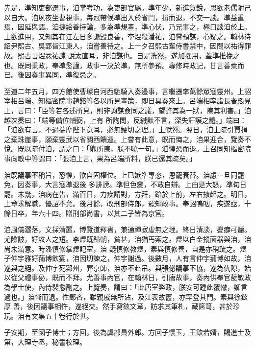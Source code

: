 \begin{pinyinscope}
 先是，準知吏部選事，洎掌考功，為吏部官屬。準年少，新進氣銳，思欲老儒附己以自大。洎夙夜坐曹視事，每冠帶候準出入於省門，揖而退，不交一談。準益重焉，因延與語。洎捷給善持論，多為準規畫，準心伏，乃兄事之，極口談洎於上。上欲進用，又知其在江左日多讒毀良善，李煜殺潘祐，洎嘗預謀，心疑之。翰林待詔尹熙古、吳郢皆江東人，洎嘗善待之。上一夕召熙古輩侍書禁中，因問以祐得罪故。熙古言煜忿祐諫
 說太直耳，非洎謀也。自是洗然，遂加擢用，蓋準推挽之也。既同秉政，奉準愈謹，政事一決於準，無所參預。專修時政記，甘言善柔而已。後因奏事異同，準復忌之。



 至道二年五月，四方館使曹璨自河西馳騎入奏邊事，言繼遷率萬餘眾寇靈州。上詔宰相呂端、知樞密院事趙鎔等各以所見畫策，即日具奏來上。呂端相率詣長春殿見上，言曰：「臣等若各述所見，則非詢謀僉同之議，望許其為一狀，陳其利害。」洎越次奏曰：「端等備位輔弼，上有
 所詢問，反緘默不言，深失訐謨之體。」端曰：「洎欲有言，不過揣摩陛下意耳，必無鯁切之理。」上默然。翌日，洎上疏引賈捐之棄珠崖事，願棄靈武以省關西饋運。上嘗有此意，既而悔之，洎果迎合，覽奏不悅。既以疏付洎，謂之曰：「卿所陳，朕不曉一句。」洎惶恐而退。上召同知樞密院事向敏中等謂曰：「張洎上言，果為呂端所料，朕已還其疏矣。」



 洎既議事不稱旨，恐懼，欲自固權位。上已嫉準專恣，恩寵衰替。洎慮一旦同罷免，因奏事，大言寇準退後
 多誹謗。準但色變，不敢自辯。上由是大怒，準旬日罷。未幾，洎病在告，滿百日，力疾請對，方拜，踣於上前，左右掖起之。明日，上章求解職，優詔不允。後月餘，改刑部侍郎，罷知政事。奉詔嗚咽，疾遂亟，十餘日卒，年六十四。贈刑部尚書，以其二子皆為京官。



 洎風儀灑落，文採清麗，博覽道釋書，兼通禪寂虛無之理。終日清談，亹癖可聽。尤險詖，好攻人之短。李煜既歸朝，貧甚，洎猶丐索之。煜以白金摐面器與洎，洎尚未滿意。時潘慎修掌煜記室，洎
 疑慎修教煜，素與慎修善，自是亦稍疏之。煜子仲宇雅好蒱博飲宴，洎因切諫之，仲宇謝過。後數月，人有言仲宇蒱博如故，洎遂與之絕。及仲宇死郢州，葬京師，洎亦不赴吊。與張佖議事不協，遂為仇隙，始以從父禮事佖，既而不拜。尤善事內官，在翰林日，引唐故事，奏內供奉官藍敏政為學士使，內侍裴愈副之。上覽奏，謂曰：「此唐室弊政，朕安可踵此覆轍，卿言過也。」洎慚而退。性鄙吝，雖親戚無所沾，及江表故舊，亦罕登其門。素與徐鉉厚
 善，後因議事相忤，遂絕交。然手寫鉉文章，訪求其筆札，藏篋笥，甚於珍玩。洎有文集五十卷行於世。



 子安期，至國子博士；方回，後為虞部員外郎。方回子懷玉，王欽若婿，賜進士及第，大理寺丞，秘書校理。




\end{pinyinscope}
